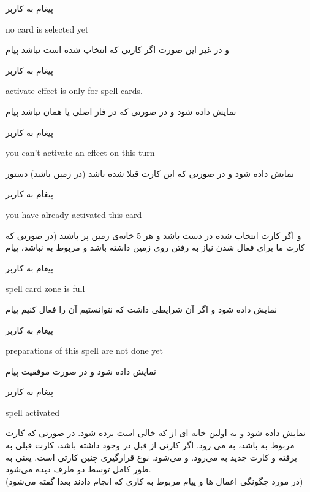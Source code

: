\documentclass[]{article}
\begin{document}
\begin{mybox}[colback=yellow]{پیغام به کاربر}
	\begin{latin}	
		no card is selected yet
	\end{latin}
\end{mybox}
و در غیر این صورت اگر کارتی که انتخاب شده است  نباشد پیام
\begin{mybox}[colback=yellow]{پیغام به کاربر}
	\begin{latin}	
		activate effect is only for spell cards.	
	\end{latin}
\end{mybox}
نمایش داده شود و در صورتی که در فاز اصلی یا همان  نباشد پیام
\begin{mybox}[colback=yellow]{پیغام به کاربر}
	\begin{latin}	
		you can’t activate an effect on this turn
	\end{latin}
\end{mybox}
نمایش داده شود و در صورتی که این کارت قبلا  شده باشد (در زمین 
باشد) دستور 
\begin{mybox}[colback=yellow]{پیغام به کاربر}
\begin{latin}	
	you have already activated this card
\end{latin}
\end{mybox}
و اگر کارت انتخاب شده در دست باشد و هر 5 خانه‌ی  زمین پر باشند (در 
صورتی که کارت ما برای فعال شدن نیاز به رفتن روی زمین داشته باشد و مربوط به 
 نباشد، پیام
\begin{mybox}[colback=yellow]{پیغام به کاربر}
\begin{latin}	
	spell card zone is full
\end{latin}
\end{mybox}
نمایش داده شود و اگر آن  شرایطی داشت که نتوانستیم آن را فعال کنیم 
پیام
\begin{mybox}[colback=yellow]{پیغام به کاربر}
	\begin{latin}	
		preparations of this spell are not done yet
	\end{latin}
\end{mybox}
نمایش داده شود و در صورت موفقیت پیام
\begin{mybox}[colback=yellow]{پیغام به کاربر}
	\begin{latin}	
		spell activated
	\end{latin}
\end{mybox}
نمایش داده شود و به اولین خانه ای از  که خالی است برده 
شود. در صورتی که کارت مربوط به  باشد، به  می 
رود. اگر کارتی از قبل در  وجود داشته باشد، کارت قبلی به 
 برفته و کارت جدید به  می‌رود. و  
می‌شود. نوع قرارگیری چنین کارتی  است. یعنی به طور کامل توسط دو طرف 
دیده 
می‌شود.
\\
(در مورد چگونگی اعمال  ها و پیام مربوط به کاری که انجام دادند بعدا 
گفته می‌شود)
\end{document}
